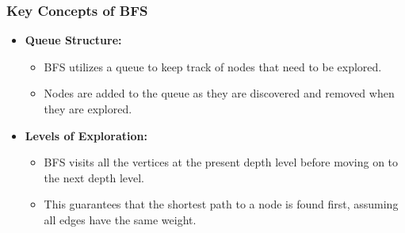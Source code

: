 \documentclass[aspectratio=169]{beamer}
\begin{document}
\begin{frame}[fragile]
    \frametitle{Key Concepts of BFS}
    \begin{itemize}
        \item \textbf{Queue Structure:}
            \begin{itemize}
                \item BFS utilizes a queue to keep track of nodes that need to be explored.
                \item Nodes are added to the queue as they are discovered and removed when they are explored.
            \end{itemize}
        \item \textbf{Levels of Exploration:}
            \begin{itemize}
                \item BFS visits all the vertices at the present depth level before moving on to the next depth level.
                \item This guarantees that the shortest path to a node is found first, assuming all edges have the same weight.
            \end{itemize}
    \end{itemize}
\end{frame}
\end{document}
